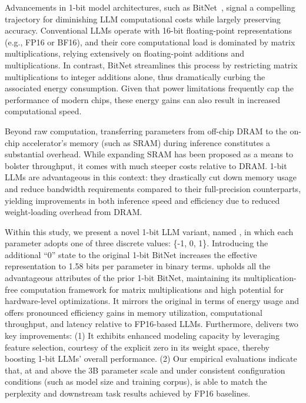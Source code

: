 Advancements in 1-bit model architectures, such as BitNet~\cite{bitnet}, signal a compelling trajectory for diminishing LLM computational costs while largely preserving accuracy. Conventional LLMs operate with 16-bit floating-point representations (e.g., FP16 or BF16), and their core computational load is dominated by matrix multiplications, relying extensively on floating-point additions and multiplications. In contrast, BitNet streamlines this process by restricting matrix multiplications to integer additions alone, thus dramatically curbing the associated energy consumption. Given that power limitations frequently cap the performance of modern chips, these energy gains can also result in increased computational speed.

Beyond raw computation, transferring parameters from off-chip DRAM to the on-chip accelerator’s memory (such as SRAM) during inference constitutes a substantial overhead. While expanding SRAM has been proposed as a means to bolster throughput, it comes with much steeper costs relative to DRAM. 1-bit LLMs are advantageous in this context: they drastically cut down memory usage and reduce bandwidth requirements compared to their full-precision counterparts, yielding improvements in both inference speed and efficiency due to reduced weight-loading overhead from DRAM.

Within this study, we present a novel 1-bit LLM variant, named \textbf{}, in which each parameter adopts one of three discrete values: \{-1, 0, 1\}. Introducing the additional “0” state to the original 1-bit BitNet increases the effective representation to 1.58 bits per parameter in binary terms.  upholds all the advantageous attributes of the prior 1-bit BitNet, maintaining its multiplication-free computation framework for matrix multiplications and high potential for hardware-level optimizations. It mirrors the original in terms of energy usage and offers pronounced efficiency gains in memory utilization, computational throughput, and latency relative to FP16-based LLMs. Furthermore,  delivers two key improvements: (1) It exhibits enhanced modeling capacity by leveraging feature selection, courtesy of the explicit zero in its weight space, thereby boosting 1-bit LLMs’ overall performance. (2) Our empirical evaluations indicate that, at and above the 3B parameter scale and under consistent configuration conditions (such as model size and training corpus),  is able to match the perplexity and downstream task results achieved by FP16 baselines.

